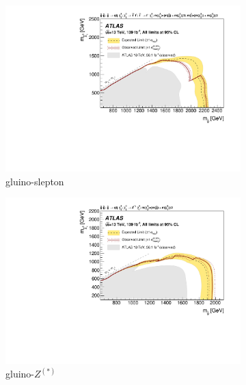 \begin{figure}[tp]
\centering
\begin{subfigure}{0.48\textwidth}
\centering
\includegraphics[width=\textwidth]{figures/2ljets_strong_contours_gluino_slepton.pdf}
\caption{gluino-slepton}
\end{subfigure}
\hfill
\begin{subfigure}{0.48\textwidth}
\centering
\includegraphics[width=\textwidth]{figures/2ljets_strong_contours_gluino_z.pdf}
\caption{gluino-$Z^{(*)}$}
\end{subfigure}
\\[0.5em]
\begin{subfigure}{0.48\textwidth}
\centering

\end{subfigure}
\end{figure}
